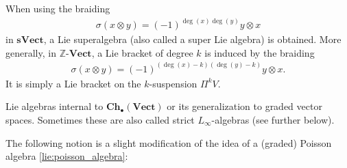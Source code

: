     \begin{example}\label{hda:lie_superalgebra}
        When using the braiding
        \begin{gather}
            \sigma(x\otimes y) = (-1)^{\deg(x)\deg(y)}y\otimes x
        \end{gather}
        in $\mathbf{sVect}$, a Lie superalgebra (also called a super Lie algebra) is obtained. More generally, in $\mathbb{Z}$-$\mathbf{Vect}$, a Lie bracket of degree $k$ is induced by the braiding
        \begin{gather}
            \sigma(x\otimes y) = (-1)^{(\deg(x)-k)(\deg(y)-k)}y\otimes x.
        \end{gather}
        It is simply a Lie bracket on the $k$-suspension $\Pi^kV$.
    \end{example}
    \begin{example}
        Lie algebras internal to $\mathbf{Ch_\bullet(Vect)}$ or its generalization to graded vector spaces. Sometimes these are also called strict $L_\infty$-algebras (see further below).
    \end{example}

    The following notion is a slight modification of the idea of a (graded) Poisson algebra \ref{lie:poisson_algebra}:

